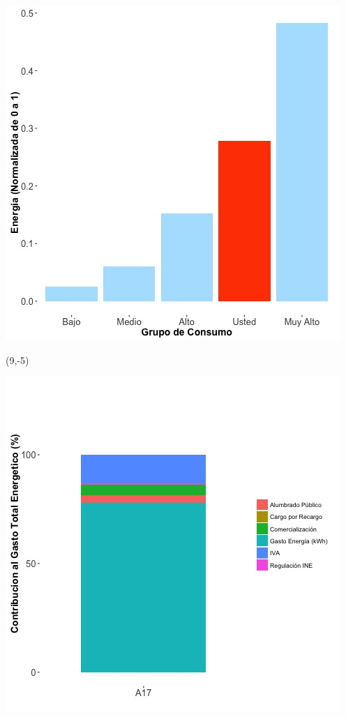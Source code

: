 \documentclass{article}\usepackage[]{graphicx}\usepackage[]{color}
\newenvironment{knitrout}{}{} %
\begin{document}
\begin{knitrout}
\color{fgcolor}
\includegraphics[scale=0.65]{figure/A17_neighbor_plot} 
\end{knitrout}

 \begin{textblock}{1}(9,-5)
\begin{minipage}{20em}
\begingroup

\endgroup
\end{minipage}
\end{textblock}

\begin{knitrout}
\color{fgcolor}
\includegraphics[scale=0.65]{figure/A17_costvars_plot.jpg} 
\end{knitrout}
\end{document}
